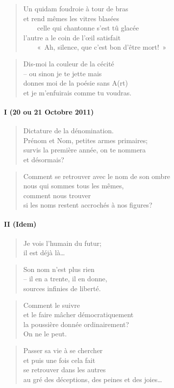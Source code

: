   \begin{verse}
    Un quidam foudroie à tour de bras\\
    et rend mêmes les vitres blasées\\
    ~~~~celle qui chantonne s’est tû glacée\\
    l’autre a le coin de l’œil satisfait\\
    ~~~~«~Ah, silence, que c’est bon d’être mort!~»
  \end{verse}
  \begin{verse}
    Dis-moi la couleur de la cécité\\
    -- ou sinon je te jette mais\\
    donnes moi de la poésie sans A(rt)\\
    et je m’enfuirais comme tu voudras.
  \end{verse}
  \paragraph*{I (20 ou 21 Octobre 2011)}
  \begin{verse}
    Dictature de la dénomination.\\
    Prénom et Nom, petites armes primaires;\\
    survis la première année, on te nommera\\
    et désormais?
  \end{verse}
  \begin{verse}
    Comment se retrouver avec le nom de son ombre\\
    nous qui sommes tous les mêmes,\\
    comment nous trouver\\
    si les noms restent accrochés à nos figures?
  \end{verse}
  \paragraph*{II (Idem)}
  \begin{verse}
    Je vois l’humain du futur;\\
    il est déjà là…
  \end{verse}
  \begin{verse}
    Son nom n’est plus rien\\
    -- il en a trente, il en donne,\\
    sources infinies de liberté.
  \end{verse}
  \begin{verse}
    Comment le suivre\\
    et le faire mâcher démocratiquement\\
    la poussière donnée ordinairement?\\
    On ne le peut.
  \end{verse}
  \begin{verse}
    Passer sa vie à se chercher\\
    et puis une fois cela fait\\
    se retrouver dans les autres\\
    au gré des déceptions, des peines et des joies…
  \end{verse}
